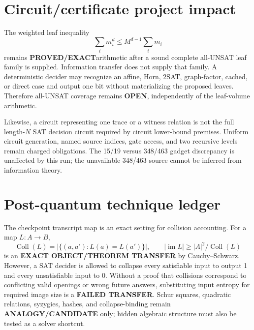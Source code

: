 \documentclass[11pt]{article}
\newcommand{\proved}{\textbf{PROVED/EXACT}}
\newcommand{\openstatus}{\textbf{OPEN}}
\begin{document}
\section*{Circuit/certificate project impact}
The weighted leaf inequality
\[
\sum_i m_i^d\le M^{d-1}\sum_i m_i
\]
remains \proved arithmetic after a sound complete all-UNSAT leaf family is supplied.
Information transfer does not supply that family.  A deterministic decider may
recognize an affine, Horn, 2SAT, graph-factor, cached, or direct case and output one bit
without materializing the proposed leaves.  Therefore all-UNSAT coverage remains
\openstatus, independently of the leaf-volume arithmetic.

Likewise, a circuit representing one trace or a witness relation is not the full
length-$N$ SAT decision circuit required by circuit lower-bound premises.  Uniform
circuit generation, named source indices, gate access, and two recursive levels remain
charged obligations.  The 15/19 versus 348/463 gadget discrepancy is unaffected by
this run; the unavailable 348/463 source cannot be inferred from information theory.

\section*{Post-quantum technique ledger}
The checkpoint transcript map is an exact setting for collision accounting.  For a
map $L:A\to B$,
\[
 \operatorname{Coll}(L)=|\{(a,a'):L(a)=L(a')\}|,
 \qquad |\operatorname{im}L|\ge |A|^2/\operatorname{Coll}(L)
\]
is an \textbf{EXACT OBJECT/THEOREM TRANSFER} by Cauchy--Schwarz.  However, a SAT
decider is allowed to collapse every satisfiable input to output 1 and every
unsatisfiable input to 0.  Without a proof that collisions correspond to conflicting
valid openings or wrong future answers, substituting input entropy for required image
size is a \textbf{FAILED TRANSFER}.  Schur squares, quadratic relations, syzygies,
hashes, and collapse-binding remain \textbf{ANALOGY/CANDIDATE} only; hidden algebraic
structure must also be tested as a solver shortcut.
\end{document}
